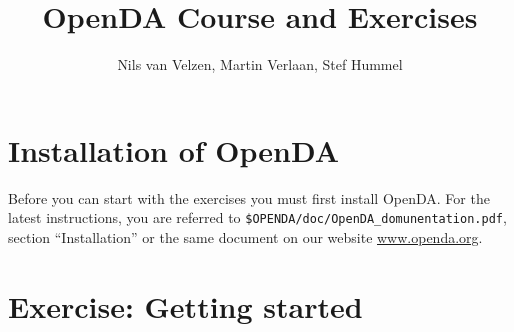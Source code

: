 \documentclass[a4paper,10pt]{article}
\title{OpenDA Course and Exercises}
\author{Nils van Velzen, Martin Verlaan, Stef Hummel}
\begin{document}


\maketitle


\tableofcontents

\section*{Installation of OpenDA}
Before you can start with the exercises you must first install OpenDA. For the
latest instructions, you are referred to \verb|$OPENDA/doc/OpenDA_domunentation.pdf|, 
section ``Installation'' or the same document on our website \url{www.openda.org}.

\newpage
\section{Exercise: Getting started}

\end{document}
